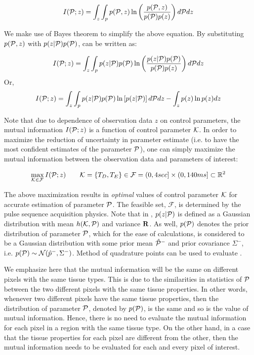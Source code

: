 \documentclass{article}         %
\theoremstyle{definition}
\theoremstyle{remark}
\begin{document}
\begin{equation} \label{mi}
I(\mathcal{P};z)=\int_z\int_p p(\mathcal{P},z)\ln\left(\frac{p(\mathcal{P},z)}{p(\mathcal{P})p(z)}\right)d\mathcal{P} dz
\end{equation}

We make use of Bayes theorem to simplify the above equation. By substituting $p(\mathcal{P},z)$ with $p(z|\mathcal{P})p(\mathcal{P})$,  can be written as:

\begin{equation} \label{mi2}
I(\mathcal{P};z)=\int_z\int_p p(z|\mathcal{P})p(\mathcal{P})\ln\left(\frac{p(z|\mathcal{P})p(\mathcal{P})}{p(\mathcal{P})p(z)}\right)d\mathcal{P} dz
\end{equation}
Or,
\begin{equation} \label{mi3}
I(\mathcal{P};z)=\int_z\int_p p(z|\mathcal{P})p(\mathcal{P})\ln\left[p(z|\mathcal{P})\right]d\mathcal{P} dz - \int_z p(z) \ln p(z)dz
\end{equation}



Note that due to dependence of observation data $z$ on control parameters, the mutual information $I(\mathcal{P};z)$ is a function of control parameter $\mathcal{K}$. In order to maximize the reduction of uncertainty in parameter estimate (i.e. to have the most confident estimates of the parameter $\mathcal{P}$), one can simply maximize the mutual information between the observation data and parameters of interest:

\begin{equation}\label{mimax}
\max_{\mathcal{K} \in \mathcal{F}} I(\mathcal{P};z)
\qquad
\mathcal{K}=\{T_D,T_E\} \in \mathcal{F} = (0,4sec] \times (0,140ms] \subset \mathbb{R}^2 
\end{equation}

The above maximization results in \textit{optimal} values of control parameter
$\mathcal{K}$ for accurate estimation of parameter $\mathcal{P}$. 
The feasible set, $\mathcal{F}$, is determined by the pulse sequence acquisition physics.
Note that in ,
$p(z|\mathcal{P})$ is defined as a Gaussian distribution with mean $h(\mathcal{K},\mathcal{P})$ and
variance $\mathbf{R}$. As well, $p(\mathcal{P})$ denotes the prior distribution of parameter
$\mathcal{P}$, which for the ease of calculations, is considered to be a Gaussian
distribution with some prior mean $\hat{\mathcal{P}}^-$ and prior covariance $\Sigma^-$,
i.e. $p(\mathcal{P})\sim \mathcal{N}(\hat{p}^-,\Sigma^-)$. Method of quadrature points
can be used to evaluate . 

We emphasize here that the mutual information will be the same on different pixels with the same tissue types. This is due to the similarities in statistics of $\mathcal{P}$ between the two different pixels with the same tissue properties. In other words, whenever two different pixels have the same tissue properties, then the distribution of parameter $\mathcal{P}$, denoted by $p(\mathcal{P})$, is the same and so is the value of mutual information. Hence, there is no need to evaluate the mutual information for each pixel in a region with the same tissue type. 
On the other hand, in a case that the tissue properties for each pixel are different from the other, then the mutual information needs to be evaluated for each and every pixel of interest.
\end{document}
